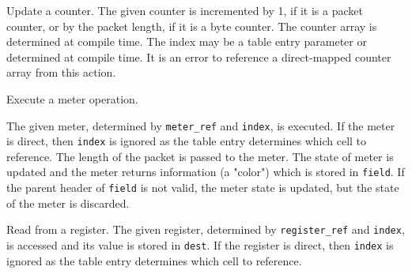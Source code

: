 \documentclass[12pt]{article}
\begin{document}

{ %
Update a counter.
}
{ %
}
{ %
The given counter is incremented by 1, if it is a packet counter, or by the 
packet length, if it is a byte counter.  The counter array is determined 
at compile time.  The index may be a table entry parameter or determined at 
compile time. It is an error to reference a direct-mapped counter array from 
this action.
}


{ %
Execute a meter operation.
}
{ %
}
{ %
The given meter, determined by \texttt{meter_ref} and \texttt{index}, is executed. If the 
meter is direct, then \texttt{index} is ignored as the table entry determines which 
cell to reference. The length of the packet is passed to the meter. The state 
of meter is updated and the meter returns information (a "color") which is 
stored in \texttt{field}. If the parent header of \texttt{field} is not valid, the meter 
state is updated, but the state of the meter is discarded.

}


{\color{red}
{ %
Read from a register.
}
{ %
}
{ %
The given register, determined by \texttt{register_ref} and \texttt{index}, is accessed and its value is stored in \texttt{dest}. If the register is direct, then \texttt{index} is ignored as the table entry determines which 
cell to reference.
}
}
\end{document}
